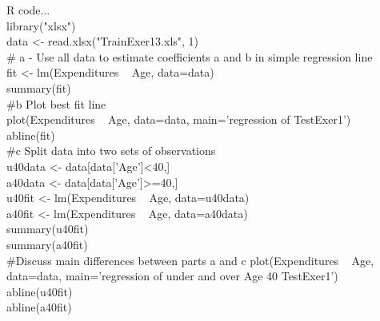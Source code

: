 \documentclass{article}
\begin{document}
\begin{enumerate}
R code...\\
library("xlsx") \\
data <- read.xlsx("TrainExer13.xls", 1) \\

\# a - Use all data to estimate coefficients a and b in simple regression line \\
fit <- lm(Expenditures ~ Age, data=data) \\
summary(fit)\\

\#b Plot best fit line\\
plot(Expenditures ~ Age, data=data, main='regression of TestExer1')\\
abline(fit)\\

\#c Split data into two sets of observations\\
u40data <- data[data['Age']<40,]\\
a40data <- data[data['Age']>=40,]\\

u40fit <- lm(Expenditures ~ Age, data=u40data)\\
a40fit <- lm(Expenditures ~ Age, data=a40data)\\
summary(u40fit)\\
summary(a40fit)\\

\#Discuss main differences between parts a and c
plot(Expenditures ~ Age, data=data, main='regression of under and over Age 40 TestExer1')\\
abline(u40fit)\\
abline(a40fit)\\


\end{enumerate}
\end{document}
